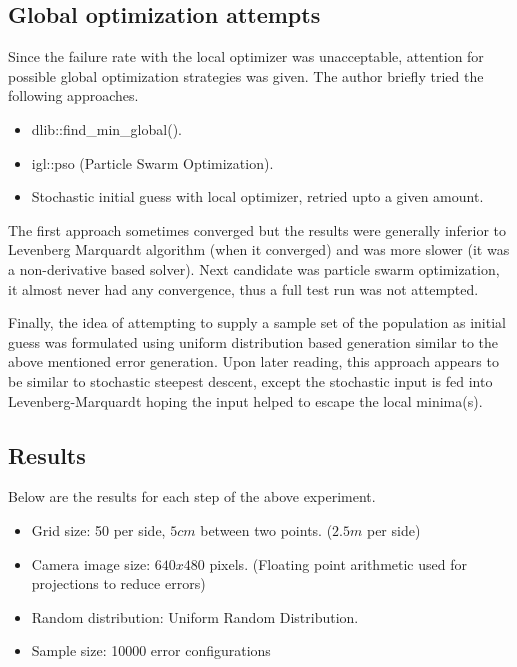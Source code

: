 \documentclass[english, printversion, nomenclature, notitle]{tuvisionthesis} %
\makeatletter
\renewcommand{\todo}[2][]{\tikzexternaldisable\@todo[#1]{#2}\tikzexternalenable}
\makeatother
\begin{document}
\subsection{Global optimization attempts}
Since the failure rate with the local optimizer was unacceptable, attention for possible global optimization strategies was given. The author briefly tried the following approaches.
\begin{itemize}
	\item dlib::find\_min\_global(). \todo{cite}
	\item igl::pso (Particle Swarm Optimization). \todo{cite?}
	\item Stochastic initial guess with local optimizer, retried upto a given amount.
\end{itemize}

The first approach sometimes converged but the results were generally inferior to Levenberg Marquardt algorithm (when it converged) and was more slower (it was a non-derivative based solver). Next candidate was particle swarm optimization, it almost never had any convergence, thus a full test run was not attempted.

Finally, the idea of attempting to supply a sample set of the population as initial guess was formulated using uniform distribution based generation similar to the above mentioned error generation. Upon later reading, this approach appears to be similar to stochastic steepest descent, except the stochastic input is fed into Levenberg-Marquardt hoping the input helped to escape the local minima(s). \todo{literature?}

\subsection{Results}

Below are the results for each step of the above experiment.  

\begin{itemize}
	\item Grid size: 50 per side, $5cm$ between two points. ($2.5m$ per side)
	\item Camera image size: $640 x 480$ pixels. (Floating point arithmetic used for projections to reduce errors)
	\item Random distribution: Uniform Random Distribution.
	\item Sample size: 10000 error configurations
\end{itemize}
\end{document}
